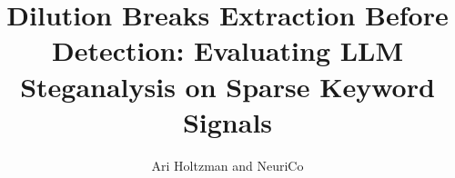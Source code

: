 \documentclass{article}
\title{Dilution Breaks Extraction Before Detection: Evaluating LLM Steganalysis on Sparse Keyword Signals}
\author{Ari Holtzman and NeuriCo}
\begin{document}
\maketitle

\begin{abstract}

\end{abstract}









\end{document}
